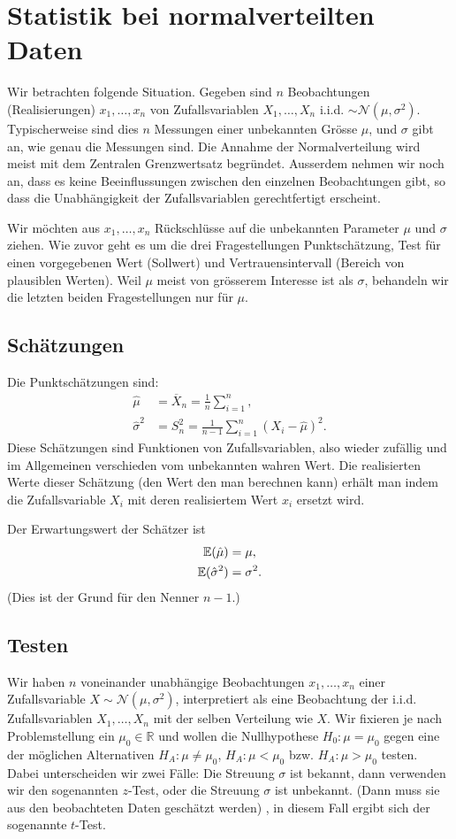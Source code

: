 \chapter{Statistik bei normalverteilten Daten}
Wir betrachten folgende Situation. Gegeben sind $n$ Beobachtungen (Realisierungen) $x_1,\ldots,x_n$ von Zufallsvariablen $X_1,\ldots,X_n$ i.i.d. $\sim \mathcal{N}(\mu,\sigma^2)$. Typischerweise sind dies $n$ Messungen einer unbekannten Grösse $\mu$, und $\sigma$ gibt an, wie genau die Messungen sind. Die Annahme der Normalverteilung wird meist mit dem Zentralen Grenzwertsatz begründet. Ausserdem nehmen wir noch an, dass es keine Beeinflussungen zwischen den einzelnen Beobachtungen gibt, so dass die Unabhängigkeit der Zufallsvariablen gerechtfertigt erscheint.

Wir möchten aus $x_1,\ldots,x_n$ Rückschlüsse auf die unbekannten Parameter $\mu$ und $\sigma$ ziehen. Wie zuvor geht es um die drei Fragestellungen Punktschätzung, Test für einen vorgegebenen Wert (Sollwert) und Vertrauensintervall (Bereich von plausiblen Werten). Weil $\mu$ meist von grösserem Interesse ist als $\sigma$, behandeln wir die letzten beiden Fragestellungen nur für $\mu$.
\section{Schätzungen}
Die Punktschätzungen sind:
\begin{align}
	\hat{\mu}&=\overline{X}_n=\frac{1}{n}\sum_{i=1}^{n},\\
	\hat{\sigma}^2&=S_{n}^{2}=\frac{1}{n-1}\sum_{i=1}^{n}\left( X_i-\hat{\mu} \right)^2.
	\label{eq:schaetzer}
\end{align}
Diese Schätzungen sind Funktionen von Zufallsvariablen, also wieder zufällig und im Allgemeinen verschieden vom unbekannten wahren Wert. Die realisierten Werte dieser Schätzung (den Wert den man berechnen kann) erhält man indem die Zufallsvariable $X_i$ mit deren realisiertem Wert $x_i$ ersetzt wird.

Der Erwartungswert der Schätzer ist
\begin{align*}
	\operatorname{\mathbb E}(\hat{\mu})&=\mu,\\
	\operatorname{\mathbb E}(\hat{\sigma}^2)&=\sigma^2.
\end{align*}
(Dies ist der Grund für den Nenner $n-1$.)
\section{Testen}
\label{sec9.2}
Wir haben $n$ voneinander unabhängige Beobachtungen $x_1,\ldots,x_n$ einer Zufallsvariable $X\sim \mathcal{N}(\mu,\sigma^2)$, interpretiert als eine Beobachtung der i.i.d. Zufallsvariablen $X_1,\ldots,X_n$ mit der selben Verteilung wie $X$. Wir fixieren je nach Problemstellung ein $\mu_0\in\mathbb{R}$ und wollen die Nullhypothese $H_0:\mu=\mu_0$ gegen eine der möglichen Alternativen $H_A:\mu\neq \mu_0$, $H_A:\mu<\mu_0$ bzw. $H_A:\mu>\mu_0$ testen. Dabei unterscheiden wir zwei Fälle: Die Streuung $\sigma$ ist bekannt, dann verwenden wir den sogenannten $z$-Test, oder die Streuung $\sigma$ ist unbekannt. (Dann muss sie aus den beobachteten Daten geschätzt werden) , in diesem Fall ergibt sich der sogenannte $t$-Test.
